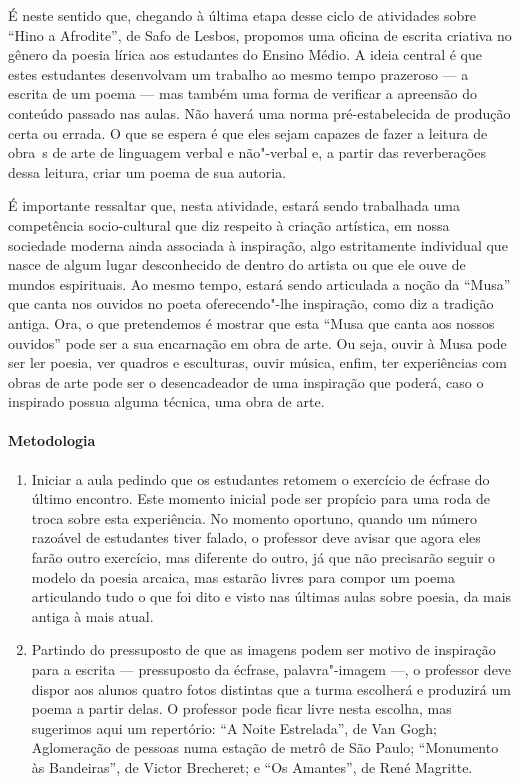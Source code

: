 \documentclass[12pt]{extarticle}
\begin{document}
É neste sentido que, chegando à última etapa desse ciclo de atividades sobre
``Hino a Afrodite'', de Safo de Lesbos, propomos uma oficina de escrita criativa
no gênero da poesia lírica aos estudantes do Ensino Médio. A ideia central
é que estes estudantes desenvolvam um trabalho ao mesmo tempo prazeroso ---
a escrita de um poema --- mas também uma forma de verificar a apreensão do
conteúdo passado nas aulas. Não haverá uma norma pré-estabelecida de
produção certa ou errada. O que se espera é que eles sejam capazes de fazer
a leitura de obra~s de arte de linguagem verbal e não"-verbal e, a partir
das reverberações dessa leitura, criar um poema de sua autoria. 

É importante ressaltar que, nesta atividade, estará sendo trabalhada uma 
competência socio-cultural que diz respeito à criação artística, em nossa
sociedade moderna ainda associada à inspiração, algo estritamente individual
que nasce de algum lugar desconhecido de dentro do artista ou que ele ouve
de mundos espirituais. Ao mesmo tempo, estará sendo articulada a noção da ``Musa''
que canta nos ouvidos no poeta oferecendo"-lhe inspiração, como diz a tradição
antiga. Ora, o que pretendemos é mostrar que esta ``Musa que canta aos nossos
ouvidos'' pode ser a sua encarnação em obra de arte. Ou seja, ouvir à Musa
pode ser ler poesia, ver quadros e esculturas, ouvir música, enfim, ter 
experiências com obras de arte pode ser o desencadeador de uma inspiração
que poderá, caso o inspirado possua alguma técnica, uma obra de arte.

\paragraph{Metodologia}

\begin{enumerate}

\item
Iniciar a aula pedindo que os estudantes retomem  o exercício de écfrase do
último encontro. Este momento inicial pode ser propício para uma roda de troca
sobre esta experiência. No momento oportuno, quando um número razoável de 
estudantes tiver falado, o professor deve avisar que agora eles farão
outro exercício, mas diferente do outro, já que não precisarão seguir 
o modelo da poesia arcaica, mas estarão livres para compor um poema
articulando tudo o que foi dito e visto nas últimas aulas sobre poesia,
da mais antiga à mais atual.

\item
Partindo do pressuposto de que as imagens podem ser motivo de inspiração
para a escrita --- pressuposto da écfrase, palavra"-imagem ---, o professor
deve dispor aos alunos quatro fotos distintas que a turma escolherá e 
produzirá um poema a partir delas. O professor pode ficar livre nesta escolha,
mas sugerimos aqui um repertório: ``A Noite Estrelada'', de Van Gogh; Aglomeração
de pessoas numa estação de metrô de São Paulo; ``Monumento às Bandeiras'', 
de Victor Brecheret; e ``Os Amantes'', de René Magritte.

\end{enumerate}
\end{document}

